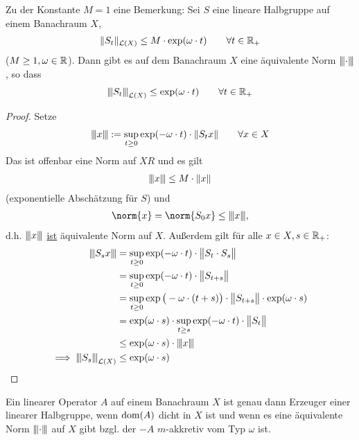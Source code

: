 \begin{bemerkung}
	Zu der Konstante $M=1$ eine Bemerkung: Sei $S$ eine lineare Halbgruppe auf einem Banachraum $X$,
	\begin{align*}
		\Vert S_t\Vert_{\mathcal{L}(X)}\leq M\cdot\exp(\omega\cdot t)\qquad\forall t\in\mathbb{R}_+
	\end{align*}
	($M\geq1,\omega\in\mathbb{R}$). 
	Dann gibt es auf dem Banachraum $X$ eine äquivalente Norm $\normiii{\cdot}$, so dass
	\begin{align*}
		\normiii{S_t}_{\L(X)}\leq\exp(\omega\cdot t)\qquad\forall t\in\R_+
	\end{align*} 
\end{bemerkung}

\begin{proof}
	Setze
	\begin{align*}
		\normiii{x}:=\sup\limits_{t\geq0}\exp(-\omega\cdot t)\cdot\Vert S_t x\Vert\qquad\forall x\in X
	\end{align*}
	Das ist offenbar eine Norm auf $XR$ und es gilt 
	\begin{align*}
		\normiii{x}\leq M\cdot\Vert x\Vert
	\end{align*}
	(exponentielle Abschätzung für $S$) und 
	\begin{align*}
		\norm{x}=\norm{S_0 x}\leq\normiii{x},
	\end{align*}
	d.h. $\normiii{x}$ \underline{ist} äquivalente Norm auf $X$. 
	Außerdem gilt für alle $x\in X, s\in\mathbb{R}_+$:
	\begin{align*}
		\normiii{S_s x}
		&=\sup\limits_{t\geq0}\exp(-\omega\cdot t)\cdot\big\Vert S_t\cdot S_s\big\Vert\\
		&=\sup\limits_{t\geq0}\exp(-\omega\cdot t)\cdot\big\Vert S_{t+s}\big\Vert\\
		&=\sup\limits_{t\geq0}\exp\big(-\omega\cdot(t+s)\big)\cdot\big\Vert S_{t+s}\big\Vert\cdot\exp(\omega\cdot s)\\
		&=\exp(\omega\cdot s)\cdot\sup\limits_{t\geq s}\exp(-\omega\cdot t)\cdot\big\Vert S_{t}\big\Vert\\\
		&\leq\exp(\omega\cdot s)\cdot\normiii{x}\\
		\implies \normiii{S_s}_{\L(X)}&\leq\exp(\omega\cdot s)
	\end{align*}
\end{proof}

\begin{theorem}[Ohne Namen]\enter
	Ein linearer Operator $A$ auf einem Banachraum $X$ ist genau dann Erzeuger einer linearer Halbgruppe, 
	wenn $\operatorname{dom}(A)$ dicht in $X$ ist und wenn es eine äquivalente Norm $\normiii{\cdot}$ auf $X$ gibt bzgl. der $-A$ $m$-akkretiv vom Typ $\omega$ ist.
\end{theorem}

